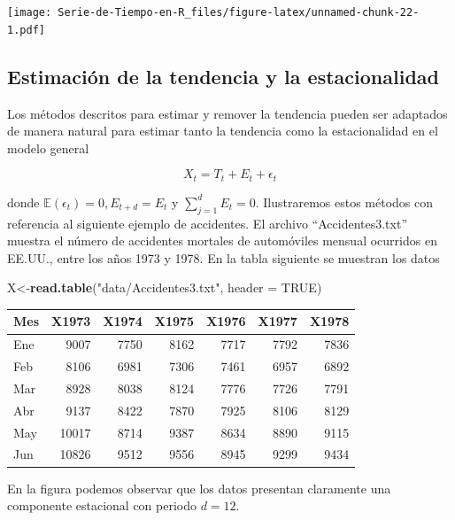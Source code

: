 \documentclass[12pt,]{krantz}
\makeatletter
\newenvironment{Shaded}{\begin{snugshade}}{\end{snugshade}}
\newcommand{\KeywordTok}[1]{\textcolor[rgb]{0.13,0.29,0.53}{\textbf{#1}}}
\newcommand{\DataTypeTok}[1]{\textcolor[rgb]{0.13,0.29,0.53}{#1}}
\newcommand{\StringTok}[1]{\textcolor[rgb]{0.31,0.60,0.02}{#1}}
\newcommand{\OtherTok}[1]{\textcolor[rgb]{0.56,0.35,0.01}{#1}}
\newcommand{\NormalTok}[1]{#1}
\newenvironment{kframe}{%
\medskip{}
\setlength{\fboxsep}{.8em}
 \def\at@end@of@kframe{}%
 \ifinner\ifhmode%
  \def\at@end@of@kframe{\end{minipage}}%
  \begin{minipage}{\columnwidth}%
 \fi\fi%
 \def\FrameCommand##1{\hskip\@totalleftmargin \hskip-\fboxsep
 \colorbox{shadecolor}{##1}\hskip-\fboxsep
     \hskip-\linewidth \hskip-\@totalleftmargin \hskip\columnwidth}%
 \MakeFramed {\advance\hsize-\width
   \@totalleftmargin\z@ \linewidth\hsize
   \@setminipage}}%
 {\par\unskip\endMakeFramed%
 \at@end@of@kframe}
\renewenvironment{Shaded}{\begin{kframe}}{\end{kframe}}
\theoremstyle{definition}
\theoremstyle{definition}
\theoremstyle{definition}
\theoremstyle{remark}
\makeatother
\begin{document}
\texttt{[image: Serie-de-Tiempo-en-R\_files/figure-latex/unnamed-chunk-22-1.pdf]}

\subsection{Estimación de la tendencia y la
estacionalidad}\label{estimacion-de-la-tendencia-y-la-estacionalidad}

Los métodos descritos para estimar y remover la tendencia pueden ser
adaptados de manera natural para estimar tanto la tendencia como la
estacionalidad en el modelo general

\begin{equation}
X_t = T_t + E_t + \epsilon_t
\end{equation}

donde \(\mathbb{E}(\epsilon_t)=0, E_{t+d}=E_t\) y \(\sum_{j=1}^dE_t=0\).
Ilustraremos estos métodos con referencia al siguiente ejemplo de
accidentes. El archivo ``Accidentes3.txt'' muestra el número de
accidentes mortales de automóviles mensual ocurridos en EE.UU., entre
los años 1973 y 1978. En la tabla siguiente se muestran los datos

\begin{Shaded}
\begin{Highlighting}[]
\NormalTok{X<-}\KeywordTok{read.table}\NormalTok{(}\StringTok{"data/Accidentes3.txt"}\NormalTok{, }\DataTypeTok{header =} \OtherTok{TRUE}\NormalTok{)}
\end{Highlighting}
\end{Shaded}

\begin{tabular}{l|r|r|r|r|r|r}
\hline
Mes & X1973 & X1974 & X1975 & X1976 & X1977 & X1978\\
\hline
Ene & 9007 & 7750 & 8162 & 7717 & 7792 & 7836\\
\hline
Feb & 8106 & 6981 & 7306 & 7461 & 6957 & 6892\\
\hline
Mar & 8928 & 8038 & 8124 & 7776 & 7726 & 7791\\
\hline
Abr & 9137 & 8422 & 7870 & 7925 & 8106 & 8129\\
\hline
May & 10017 & 8714 & 9387 & 8634 & 8890 & 9115\\
\hline
Jun & 10826 & 9512 & 9556 & 8945 & 9299 & 9434\\
\hline
\end{tabular}

En la figura podemos observar que los datos presentan claramente una
componente estacional con periodo \(d=12\).
\end{document}
